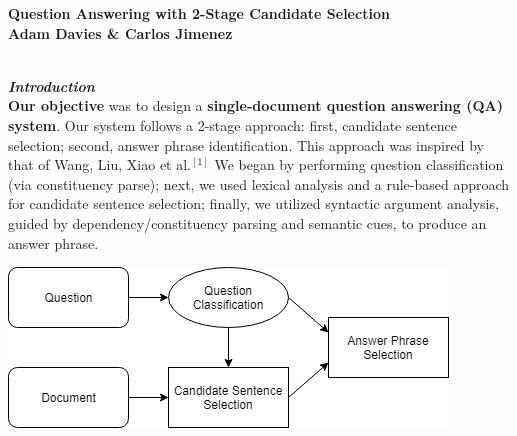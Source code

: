 \documentclass[a1,landscape]{a0poster}
\begin{document}
\begin{minipage}[c]{0.9\linewidth}
\centering
\Huge \color{NavyBlue} \textbf{Question Answering with 2-Stage Candidate Selection} \color{Black}\\ %
\LARGE \textbf{Adam Davies \& Carlos Jimenez}\\ %
\end{minipage}



\begin{multicols}{3} %
\Large

\color{SaddleBrown} %

\textit{\textbf{\LARGE \\Introduction}}\\
\textbf{Our objective} was to design a \textbf{single-document question answering (QA) system}. Our system follows a 2-stage approach: first, candidate sentence selection; second, answer phrase identification. This approach was inspired by that of Wang, Liu, Xiao et al.$^{[1]}$ We began by performing question classification (via constituency parse); next, we used lexical analysis and a rule-based approach for candidate sentence selection; finally, we utilized syntactic argument analysis, guided by dependency/constituency parsing and semantic cues, to produce an answer phrase.

\vspace{1ex}
\includegraphics[scale=1.5]{diagram-simple.png}


\end{multicols}
\end{document}
